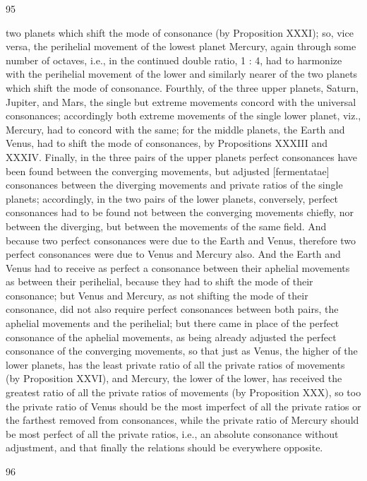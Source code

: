 \documentclass{article}
\begin{document}
95

two planets which shift the mode of consonance (by Proposition XXXI);
so, vice versa, the perihelial movement of the lowest planet Mercury,
again through some number of octaves, i.e., in the continued double
ratio, 1 : 4, had to harmonize with the perihelial movement of the lower
and similarly nearer of the two planets which shift the mode of
consonance.
Fourthly, of the three upper planets, Saturn, Jupiter, and Mars, the
single but extreme movements concord with the universal consonances;
accordingly both extreme movements of the single lower planet, viz.,
Mercury, had to concord with the same; for the middle planets, the Earth
and Venus, had to shift the mode of consonances, by Propositions
XXXIII and XXXIV.
Finally, in the three pairs of the upper planets perfect consonances have
been found between the converging movements, but adjusted
[fermentatae] consonances between the diverging movements and
private ratios of the single planets; accordingly, in the two pairs of the
lower planets, conversely, perfect consonances had to be found not
between the converging movements chiefly, nor between the diverging,
but between the movements of the same field. And because two perfect
consonances were due to the Earth and Venus, therefore two perfect
consonances were due to Venus and Mercury also. And the Earth and
Venus had to receive as perfect a consonance between their aphelial
movements as between their perihelial, because they had to shift the
mode of their consonance; but Venus and Mercury, as not shifting the
mode of their consonance, did not also require perfect consonances
between both pairs, the aphelial movements and the perihelial; but there
came in place of the perfect consonance of the aphelial movements, as
being already adjusted the perfect consonance of the converging
movements, so that just as Venus, the higher of the lower planets, has
the least private ratio of all the private ratios of movements (by
Proposition XXVI), and Mercury, the lower of the lower, has received the
greatest ratio of all the private ratios of movements (by Proposition
XXX), so too the private ratio of Venus should be the most imperfect of
all the private ratios or the farthest removed from consonances, while
the private ratio of Mercury should be most perfect of all the private
ratios, i.e., an absolute consonance without adjustment, and that finally
the relations should be everywhere opposite.


96
\end{document}
